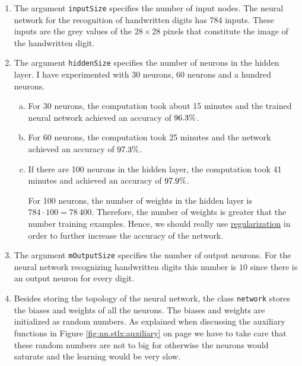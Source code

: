 \begin{enumerate}
\item The argument \texttt{inputSize} specifies the number of input nodes.  The neural network for the
      recognition of handwritten digits has 784 inputs.  These inputs are the grey values of the $28 \times 28$
      pixels that constitute the image of the handwritten digit.
\item The argument \texttt{hiddenSize} specifies the number of neurons in the hidden layer.  I have
      experimented with 30 neurons, 60 neurons and a hundred neurons.
      \begin{enumerate}[(a)]
      \item For 30 neurons, the computation took about 15 minutes and the trained neural network achieved an
            accuracy of $96.3\symbol{37}$.
      \item For 60 neurons, the computation took 25 minutes and the network achieved an accuracy of
            $97.3\symbol{37}$.
      \item If there are 100 neurons in the hidden layer, the computation took 41 minutes and achieved an
            accuracy of $97.9\symbol{37}$.

            For 100 neurons, the number of weights in the hidden layer is $784 \cdot 100 = 78\,400$.
            Therefore, the number of weights is greater that the number training examples.  Hence,
            we should really use \href{http://neuralnetworksanddeeplearning.com/chap3.html}{regularization} in
            order to further increase the accuracy of the network.
      \end{enumerate}
\item The argument \texttt{mOutputSize} specifies the number of output neurons.  For the neural network
      recognizing handwritten digits this number is $10$ since there is an output neuron for every digit.
\item Besides storing the topology of the neural network, the class \texttt{network} stores the biases and
      weights of all the neurons.  The biases and weights are initialized as random numbers.  As explained when
      discussing the auxiliary functions in Figure \ref{fig:nn.stlx:auxiliary} on page
      \pageref{fig:nn.stlx:auxiliary} we have to take care that these random numbers are not to big for
      otherwise the neurons would saturate and the learning would be very slow.
\end{enumerate}


